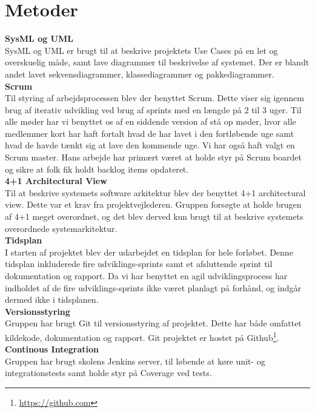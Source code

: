\section{Metoder} \label{section:metoder}

\textbf{SysML og UML}\\
SysML og UML er brugt til at beskrive projektets Use Cases på en let og overskuelig måde, samt lave diagrammer til beskrivelse af systemet. Der er blandt andet lavet sekvensdiagrammer, klassediagrammer og pakkediagrammer.\\

\textbf{Scrum}\\
Til styring af arbejdsprocessen blev der benyttet Scrum. Dette viser sig igennem brug af iterativ udvikling ved brug af sprints med en længde på 2 til 3 uger. Til alle møder har vi benyttet os af en siddende version af stå op møder, hvor alle medlemmer kort har haft fortalt hvad de har lavet i den fortløbende uge samt hvad de havde tænkt sig at lave den kommende uge. Vi har også haft valgt en Scrum master. Hans arbejde har primært været at holde styr på Scrum boardet og sikre at folk fik holdt backlog items opdateret.\\

\textbf{4+1 Architectural View} \\
Til at beskrive systemets software arkitektur blev der benyttet 4+1 architectural view. Dette var et krav fra projektvejlederen. Gruppen forsøgte at holde brugen af 4+1 meget overordnet, og det blev derved kun brugt til at beskrive systemets overordnede systemarkitektur. \\

\textbf{Tidsplan} \\
I starten af projektet blev der udarbejdet en tidsplan for hele forløbet. Denne tidsplan inkluderede fire udviklings-sprints samt et afsluttende sprint til dokumentation og rapport. Da vi har benyttet en agil udviklingsprocess har indholdet af de fire udviklings-sprints ikke været planlagt på forhånd, og indgår dermed ikke i tidsplanen. \\

\textbf{Versionsstyring} \\
Gruppen har brugt Git til versionsstyring af projektet. Dette har både omfattet kildekode, dokumentation og rapport. Git projektet er hostet på Github\footnote{\url{https://github.com}}.\\

\textbf{Continous Integration} \\
Gruppen har brugt skolens Jenkins server, til løbende at køre unit- og integrationstests samt holde styr på Coverage ved tests. \\
